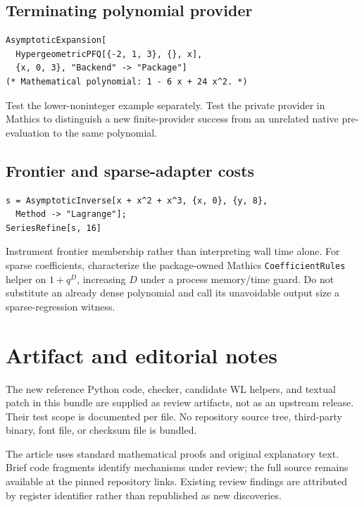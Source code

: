 \documentclass[11pt,letterpaper]{article}
\newcommand{\code}[1]{\nolinkurl{#1}}
\begin{document}
\subsection{Terminating polynomial provider}
\begin{lstlisting}
AsymptoticExpansion[
  HypergeometricPFQ[{-2, 1, 3}, {}, x],
  {x, 0, 3}, "Backend" -> "Package"]
(* Mathematical polynomial: 1 - 6 x + 24 x^2. *)
\end{lstlisting}
Test the lower-noninteger example separately. Test the private provider in
Mathics to distinguish a new finite-provider success from an unrelated native
pre-evaluation to the same polynomial.

\subsection{Frontier and sparse-adapter costs}
\begin{lstlisting}
s = AsymptoticInverse[x + x^2 + x^3, {x, 0}, {y, 8},
  Method -> "Lagrange"];
SeriesRefine[s, 16]
\end{lstlisting}
Instrument frontier membership rather than interpreting wall time alone.
For sparse coefficients, characterize the package-owned Mathics
\code{CoefficientRules} helper on $1+q^D$, increasing $D$ under a process
memory/time guard. Do not substitute an already dense polynomial and call
its unavoidable output size a sparse-regression witness.

\section{Artifact and editorial notes}
The new reference Python code, checker, candidate WL helpers, and textual
patch in this bundle are supplied as review artifacts, not as an upstream
release. Their test scope is documented per file. No repository source tree,
third-party binary, font file, or checksum file is bundled.

The article uses standard mathematical proofs and original explanatory
text. Brief code fragments identify mechanisms under review; the full
source remains available at the pinned repository links. Existing review
findings are attributed by register identifier rather than republished as
new discoveries.
\end{document}
